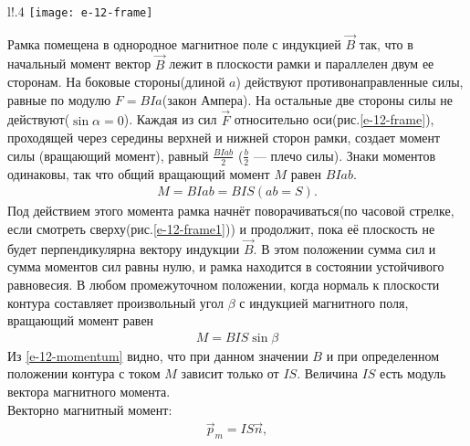 \documentclass[__main__.tex]{subfiles}
\begin{document}
\begin{wrapfigure}[16]{l!}{.4\linewidth}
	\texttt{[image: e-12-frame]}
	\caption{Прямоугольная рамка с током}
		\label{e-12-frame}
\end{wrapfigure}
Рамка помещена в однородное магнитное поле с индукцией $\vec{B}$ так, что в начальный момент вектор $\vec{B}$ лежит в плоскости рамки и параллелен двум ее сторонам. На боковые стороны(длиной $a$) действуют противонаправленные силы, равные по модулю $F = BIa$(закон Ампера). На остальные две стороны силы не действуют($\sin{\alpha} = 0$). Каждая из сил $\vec{F}$ относительно оси(рис.\ref{e-12-frame}), проходящей через середины верхней и нижней сторон рамки, создает момент силы (вращающий момент), равный  $\frac{BIab}{2}$ ($\frac{b}{2}$ — плечо силы). Знаки моментов одинаковы, так что общий вращающий момент $M$ равен $BIab$.
\begin{gather*}
	M = BIab = BIS (ab = S).
\end{gather*}
Под действием этого момента рамка начнёт поворачиваться(по часовой
стрелке, если смотреть сверху(рис.\ref{e-12-frame1})) и продолжит, пока её плоскость не будет перпендикулярна вектору индукции $\vec{B}$. В этом положении сумма сил и сумма моментов сил равны нулю, и рамка находится в состоянии устойчивого равновесия. В любом промежуточном положении, когда нормаль к плоскости контура составляет произвольный угол $\beta$ с индукцией магнитного поля, вращающий момент равен
\begin{gather}
	M = BIS\sin{\beta}
	\label{e-12-momentum}
\end{gather}
Из \ref{e-12-momentum} видно, что при данном значении $B$ и при определенном положении контура с током $M$ зависит только от $IS$. Величина $IS$ есть модуль вектора магнитного момента.\\
Векторно магнитный момент:
\begin{gather*}
\vec{p}_m = IS\vec{n},
\end{gather*}
\end{document}
